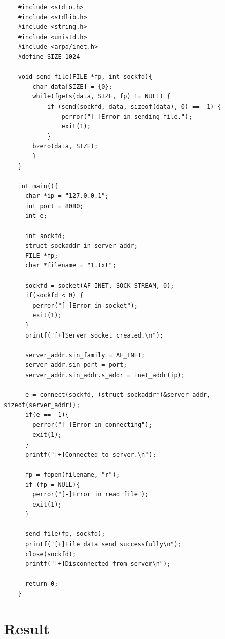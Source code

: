\documentclass{article}
\begin{document}
\begin{lstlisting}
    #include <stdio.h>
    #include <stdlib.h>
    #include <string.h>
    #include <unistd.h>
    #include <arpa/inet.h>
    #define SIZE 1024
    
    void send_file(FILE *fp, int sockfd){
        char data[SIZE] = {0};
        while(fgets(data, SIZE, fp) != NULL) {
            if (send(sockfd, data, sizeof(data), 0) == -1) {
                perror("[-]Error in sending file.");
                exit(1);
            }
        bzero(data, SIZE);
        }
    }
    
    int main(){
      char *ip = "127.0.0.1";
      int port = 8080;
      int e;
    
      int sockfd;
      struct sockaddr_in server_addr;
      FILE *fp;
      char *filename = "1.txt";
    
      sockfd = socket(AF_INET, SOCK_STREAM, 0);
      if(sockfd < 0) {
        perror("[-]Error in socket");
        exit(1);
      }
      printf("[+]Server socket created.\n");
    
      server_addr.sin_family = AF_INET;
      server_addr.sin_port = port;
      server_addr.sin_addr.s_addr = inet_addr(ip);
    
      e = connect(sockfd, (struct sockaddr*)&server_addr, sizeof(server_addr));
      if(e == -1){  
        perror("[-]Error in connecting");
        exit(1);
      }
      printf("[+]Connected to server.\n");
    
      fp = fopen(filename, "r");
      if (fp = NULL){
        perror("[-]Error in read file");
        exit(1);
      }
    
      send_file(fp, sockfd);
      printf("[+]File data send successfully\n");
      close(sockfd);
      printf("[+]Disconnected from server\n");
    
      return 0;
    }
\end{lstlisting}

\section{Result}
\end{document}

